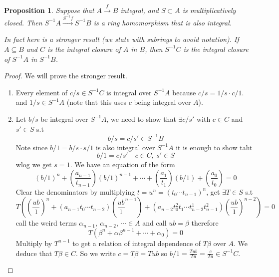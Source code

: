 \documentclass[11pt,a4paper]{article}
\theoremstyle{definition}
\theoremstyle{plain}
\newtheorem{proposition}[definition]{Proposition}
\theoremstyle{remark}
\begin{document}
\begin{proposition}
    Suppose that $A \xrightarrow{f} B$ integral, and $S \subset A$ is multiplicatively closed. Then 
    $S^{-1}A \xrightarrow{S^{-1}f} S^{-1}B$ is a ring homomorphism that is also integral. 

    In fact here is a stronger result (we state with subrings to avoid notation). If $A \subseteq B$ and $C$ is the integral closure of $A$ in $B$, then 
    $S^{-1} C$ is the integral closure of $S^{-1}A$ in $S^{-1}B$.
\end{proposition}

\begin{proof}
    We will prove the stronger result. 
    \begin{enumerate}[label = \roman*)]
        \item Every element of $c/s \in S^{-1}C$ is integral over $S^{-1}A$ because $c/s = 1/s \cdot c/1$. and $1/s \in S^{-1}A$ 
        (note that this uses $c$ being integral over $A$). 
        \item Let $b/s$ be integral over $S^{-1}A$, we need to show that $\exists c/s'$ with $c \in C$ and $s' \in S$ s.t 
        $$b/s = c/s' \in S^{-1}B$$
        Note since $b/1 = b/s \cdot s/1$ is also integral over $S^{-1}A$ it is enough to show taht 
        $$b/1 = c/s' \quad c \in C, \ s' \in S$$
        wlog we get $s=1$. We have an equation of the form 
        $$(b/1)^n + (\frac{a_{n-1}}{t_{n-1}}) (b/1)^{n-1} + \cdots + (\frac{a_1}{t_1}) (b/1) + (\frac{a_0}{t_0}) = 0$$
        Clear the denominators by multiplying $t = u^n = (t_0 \cdots t_{n-1})^n$, get $\exists T \in S$ s.t 
        $$T ((\frac{ub}{1})^n + (a_{n-1} t_0 \cdots t_{n-2}) (\frac{ub}{1}^{n-1}) + (a_{n-2} t_0^2 t_1 \cdots t_{n-2}^1 t_{n-1}^2) (\frac{ub}{1})^{n-2}) = 0$$
        call the weird terms $\alpha_{n-1}, \ \alpha_{n-2}, \ \cdots \in A$ and call $ub = \beta$ therefore 
        $$T(\beta^n + \alpha \beta^{n-1} + \cdots + \alpha_0 )= 0$$
        Multiply by $T^{n-1}$ to get a relation of integral dependence of $T\beta$ over $A$. We deduce that $T \beta \in C$. 
        So we write $c = T\beta = T u b$ so $b/1 = \frac{Tub}{Tu} = \frac{c}{Tu} \in S^{-1}C$.  
    \end{enumerate}
\end{proof}
\end{document}
